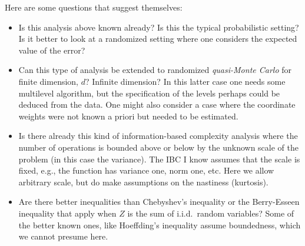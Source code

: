 \documentclass[12pt]{amsart}
\begin{document}
Here are some questions that suggest themselves:

\begin{itemize}

\item Is this analysis above known already?  Is this the typical probabilistic setting?  Is it better to look at a randomized setting where one considers the expected value of the error?

\item Can this type of analysis be extended to randomized \emph{quasi-Monte Carlo} for finite dimension, $d$?  Infinite dimension?  In this latter case one needs some multilevel algorithm, but the specification of the levels perhaps could be deduced from the data.  One might also consider a case where the coordinate weights were not known a priori but needed to be estimated.

\item Is there already this kind of information-based complexity analysis where the number of operations is bounded above or below by the unknown scale of the problem (in this case the variance).  The IBC I know assumes that the scale is fixed, e.g., the function has variance one, norm one, etc.  Here we allow arbitrary scale, but do make assumptions on the nastiness (kurtosis).

\item Are there better inequalities than Chebyshev's inequality or the Berry-Esseen inequality that apply when $Z$ is the sum of i.i.d.\ random variables?  Some of the better known ones, like Hoeffding's inequality assume boundedness, which we cannot presume here.

\end{itemize}
\end{document}

